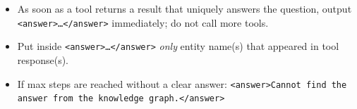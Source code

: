 \begin{table}[t!]
\begin{minipage}{\textwidth}
\begin{mdframed}[style=outerframe]
\begin{mdframed}[style=subframe]
\vspace{4pt}
\begin{itemize}[leftmargin=*, labelindent=0pt, labelsep=0.6em, itemsep=1pt, topsep=2pt]
  \small
  \item As soon as a tool returns a result that uniquely answers the question, output \texttt{<answer>{\ldots}</answer>} immediately; do not call more tools.
  \item Put inside \texttt{<answer>{\ldots}</answer>} \emph{only} entity name(s) that appeared in tool response(s).
  \item If max steps are reached without a clear answer: \texttt{<answer>Cannot find the answer from the knowledge graph.</answer>}
\end{itemize}
 
\end{mdframed}
 
\vspace{6pt}
 
 
\vspace{4pt}
\begin{mdframed}[style=subframe]
 
 
\vspace{6pt}
 
\end{mdframed}
 
\end{mdframed}
\end{minipage}
 
\end{table}
